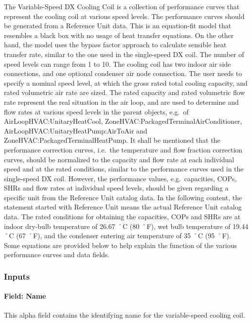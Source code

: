 The Variable-Speed DX Cooling Coil is a collection of performance curves that represent the cooling coil at various speed levels. The performance curves should be generated from a Reference Unit data. This is an equation-fit model that resembles a black box with no usage of heat transfer equations. On the other hand, the model uses the bypass factor approach to calculate sensible heat transfer rate, similar to the one used in the single-speed DX coil. The number of speed levels can range from 1 to 10. The cooling coil has two indoor air side connections, and one optional condenser air node connection. The user needs to specify a nominal speed level, at which the gross rated total cooling capacity, and rated volumetric air rate are sized. The rated capacity and rated volumetric flow rate represent the real situation in the air loop, and are used to determine and flow rates at various speed levels in the parent objects, e.g.~of AirLoopHVAC:UnitaryHeatCool, ZoneHVAC:PackagedTerminalAirConditioner, AirLoopHVAC:UnitaryHeatPump:AirToAir and ZoneHVAC:PackagedTerminalHeatPump. It shall be mentioned that the performance correction curves, i.e.~the temperature and flow fraction correction curves, should be normalized to the capacity and flow rate at each individual speed and at the rated conditions, similar to the performance curves used in the single-speed DX coil. However, the performance values, e.g.~capacities, COPs, SHRs and flow rates at individual speed levels, should be given regarding a specific unit from the Reference Unit catalog data. In the following content, the statement started with Reference Unit means the actual Reference Unit catalog data. The rated conditions for obtaining the capacities, COPs and SHRs are at indoor dry-bulb temperature of 26.67 ˚C (80 ˚F), wet bulb temperature of 19.44 ˚C (67 ˚F), and the condenser entering air temperature of 35 ˚C (95 ˚F). Some equations are provided below to help explain the function of the various performance curves and data fields.

\subsubsection{Inputs}\label{inputs-17-001}

\paragraph{Field: Name}\label{field-name-16-002}

This alpha field contains the identifying name for the variable-speed cooling coil.

